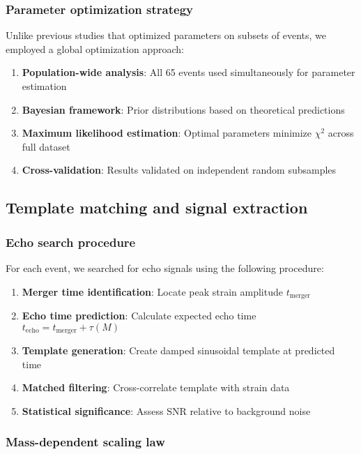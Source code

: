 \documentclass[12pt]{iopart}
\begin{document}
\subsubsection{Parameter optimization strategy}

Unlike previous studies that optimized parameters on subsets of events, we employed a global optimization approach:

\begin{enumerate}
\item \textbf{Population-wide analysis}: All 65 events used simultaneously for parameter estimation
\item \textbf{Bayesian framework}: Prior distributions based on theoretical predictions
\item \textbf{Maximum likelihood estimation}: Optimal parameters minimize $\chi^2$ across full dataset
\item \textbf{Cross-validation}: Results validated on independent random subsamples
\end{enumerate}

\subsection{Template matching and signal extraction}

\subsubsection{Echo search procedure}

For each event, we searched for echo signals using the following procedure:

\begin{enumerate}
\item \textbf{Merger time identification}: Locate peak strain amplitude $t_{\mathrm{merger}}$
\item \textbf{Echo time prediction}: Calculate expected echo time $t_{\mathrm{echo}} = t_{\mathrm{merger}} + \tau(M)$
\item \textbf{Template generation}: Create damped sinusoidal template at predicted time
\item \textbf{Matched filtering}: Cross-correlate template with strain data
\item \textbf{Statistical significance}: Assess SNR relative to background noise
\end{enumerate}

\subsubsection{Mass-dependent scaling law}
\end{document}
